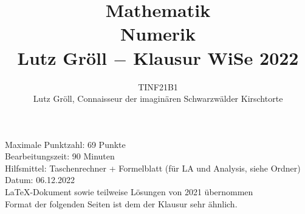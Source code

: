 \documentclass[12pt]{article}
\title{Mathematik \rom{3} \\ Numerik \\ Lutz Gröll $-$ Klausur WiSe 2022}
\author{TINF21B1 \\ Lutz Gröll, Connaisseur der imaginären Schwarzwälder Kirschtorte}
\begin{document}
\maketitle

\begin{center}
    \large
    \vspace*{7cm}
    Maximale Punktzahl: 69 Punkte\\
    \vspace*{1cm}
    Bearbeitungszeit: 90 Minuten\\
    \vspace*{1cm}
    Hilfsmittel: Taschenrechner + Formelblatt (für LA und Analysis, siehe Ordner)\\
    \vspace*{1cm}
    Datum: 06.12.2022\\
    \vspace*{1cm}
    \small \LaTeX-Dokument sowie teilweise Lösungen von 2021 übernommen \\Format der folgenden Seiten ist dem der Klausur sehr ähnlich.\\
\end{center}
\pagebreak
\end{document}
